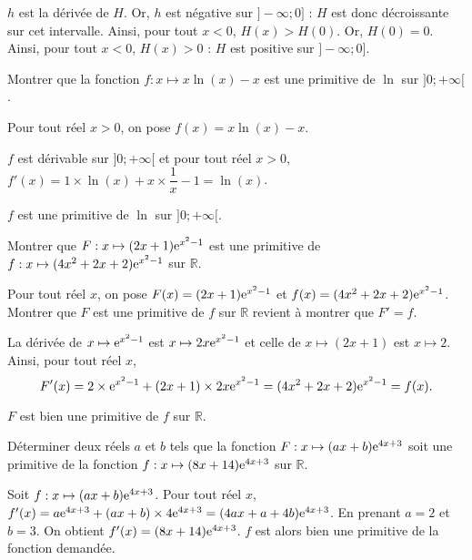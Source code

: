 \documentclass[11pt,fleqn, openany]{book} %
\begin{document}
\begin{solution}$h$ est la dérivée de $H$. Or, $h$ est négative sur $]-\infty ;0]$  : $H$ est donc décroissante sur cet intervalle. Ainsi, pour tout $x<0$, $H(x)>H(0)$. Or, $H(0)=0$. Ainsi, pour tout $x<0$, $H(x)>0$ : $H$ est positive sur $]-\infty ;0]$.\end{solution}



\begin{exercise}[topic=diff02]Montrer que la fonction $f:x\mapsto x\ln(x)-x$ est une primitive de $\ln$ sur $]0;+\infty [$.\end{exercise}

\begin{solution}Pour tout réel \(x>0\), on pose \(f(x)=x\ln(x)-x\). 

\(f\) est dérivable sur \(]0;+\infty [\) et pour tout réel \(x>0\), $f'(x)=1 \times \ln(x) + x \times \dfrac{1}{x}-1=\ln(x)$.

\(f\) est une primitive de \(\ln\) sur \(]0;+\infty [\).
 \end{solution}
 
 

\begin{exercise}[topic=diff02]Montrer que $F:x\mapsto (2x+1)\mathrm{e}^{x^2-1}$ est une primitive de $f:x\mapsto (4x^2+2x+2)\mathrm{e}^{x^2-1}$ sur $\mathbb{R}$.\end{exercise}

\begin{solution} Pour tout réel \(x\), on pose \(F(x)=(2x+1)\mathrm{e}^{x^2-1}\) et \(f(x)=(4x^2+2x+2)\mathrm{e}^{x^2-1}\). Montrer que \(F\) est une primitive de \(f\) sur \(\mathbb{R}\) revient à montrer que \(F'=f\).

La dérivée de \(x\mapsto \mathrm{e}^{x^2-1}\) est \(x\mapsto 2x\mathrm{e}^{x^2-1}\) et celle de \(x\mapsto (2x+1)\) est \(x\mapsto 2\). Ainsi, pour tout réel \(x\),
\[F'(x)=2 \times \mathrm{e}^{x^2-1} + (2x+1) \times 2x\mathrm{e}^{x^2-1}=(4x^2+2x+2)\mathrm{e}^{x^2-1}=f(x).\]

\(F\) est bien une primitive de \(f\) sur \(\mathbb{R}\).
 \end{solution}
 
 

\begin{exercise}[topic=diff02]Déterminer deux réels $a$ et $b$ tels que la fonction $F:x\mapsto (ax+b)\mathrm{e}^{4x+3}$ soit une primitive de la fonction $f:x\mapsto (8x+14)\mathrm{e}^{4x+3}$ sur $\mathbb{R}$.\end{exercise}

\begin{solution}

Soit \(f:x\mapsto (ax+b)\mathrm{e}^{4x+3}\). Pour tout réel \(x\), \(f'(x)=a\mathrm{e}^{4x+3}+(ax+b)\times 4\mathrm{e}^{4x+3}=(4ax+a+4b)\mathrm{e}^{4x+3}\). En prenant \(a=2\) et \(b=3\). On obtient \(f'(x)=(8x+14)\mathrm{e}^{4x+3}\). \(f\) est alors bien une primitive de la fonction demandée.

  \end{solution}
  
\end{document}
